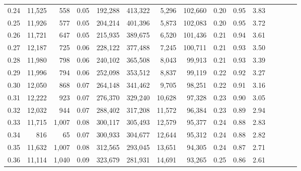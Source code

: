 \begin{tabular}{rrrcrrrrrrrrrrr}
0.24 &  11,525 &    558 &                                       0.05 &  192,288 &  413,322 &    5,296 &  102,660 &  0.20 &  0.95 &                         3.83 \\
0.25 &  11,926 &    577 &                                       0.05 &  204,214 &  401,396 &    5,873 &  102,083 &  0.20 &  0.95 &                         3.72 \\
0.26 &  11,721 &    647 &                                       0.05 &  215,935 &  389,675 &    6,520 &  101,436 &  0.21 &  0.94 &                         3.61 \\
0.27 &  12,187 &    725 &                                       0.06 &  228,122 &  377,488 &    7,245 &  100,711 &  0.21 &  0.93 &                         3.50 \\
0.28 &  11,980 &    798 &                                       0.06 &  240,102 &  365,508 &    8,043 &   99,913 &  0.21 &  0.93 &                         3.39 \\
0.29 &  11,996 &    794 &                                       0.06 &  252,098 &  353,512 &    8,837 &   99,119 &  0.22 &  0.92 &                         3.27 \\
0.30 &  12,050 &    868 &                                       0.07 &  264,148 &  341,462 &    9,705 &   98,251 &  0.22 &  0.91 &                         3.16 \\
0.31 &  12,222 &    923 &                                       0.07 &  276,370 &  329,240 &   10,628 &   97,328 &  0.23 &  0.90 &                         3.05 \\
0.32 &  12,032 &    944 &                                       0.07 &  288,402 &  317,208 &   11,572 &   96,384 &  0.23 &  0.89 &                         2.94 \\
0.33 &  11,715 &  1,007 &                                       0.08 &  300,117 &  305,493 &   12,579 &   95,377 &  0.24 &  0.88 &                         2.83 \\
0.34 &     816 &     65 &                                       0.07 &  300,933 &  304,677 &   12,644 &   95,312 &  0.24 &  0.88 &                         2.82 \\
0.35 &  11,632 &  1,007 &                                       0.08 &  312,565 &  293,045 &   13,651 &   94,305 &  0.24 &  0.87 &                         2.71 \\
0.36 &  11,114 &  1,040 &                                       0.09 &  323,679 &  281,931 &   14,691 &   93,265 &  0.25 &  0.86 &                         2.61 \\

\end{tabular}

